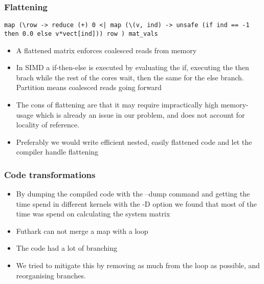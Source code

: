 \documentclass{beamer}
\begin{document}
\begin{frame}[fragile]
  \frametitle{Flattening}

  \begin{lstlisting}[frame=single, language=Futhark]
    map (\row -> reduce (+) 0 <| map (\(v, ind) -> unsafe (if ind == -1 then 0.0 else v*vect[ind])) row ) mat_vals
  \end{lstlisting}
  \begin{itemize}
    \item A flattened matrix enforces coalesced reads from memory
    \item In SIMD a if-then-else is executed by evaluating the if, executing the then brach while the rest of the cores wait, then the same for the else branch. Partition means coalesced reads going forward
    \item The cons of flattening are that it may require impractically high memory-usage which is already an issue in our problem, and does not account for locality of reference.
    \item Preferably we would write efficient nested, easily flattened code and let the compiler handle flattening %
  \end{itemize}
\end{frame}
%

\begin{frame}
\frametitle{Code transformations}
\begin{itemize}
\item{By dumping the compiled code with the --dump command and getting the time spend in different kernels with the -D option we found that most of the time was spend on calculating the system matrix}
\item{Futhark can not merge a map with a loop}
\item{The code had a lot of branching}
\item{We tried to mitigate this by removing as much from the loop as possible, and reorganising branches.}
\end{itemize}
\end{frame}
\end{document}
